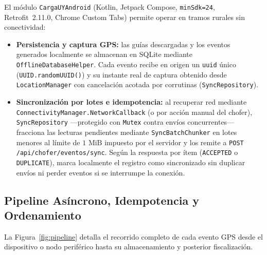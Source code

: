\documentclass[11pt,a4paper,twocolumn]{article}
\begin{document}
El módulo \texttt{CargaUYAndroid} (Kotlin, Jetpack Compose, \texttt{minSdk=24}, Retrofit~2.11.0, Chrome Custom Tabs) permite operar en tramos rurales sin conectividad:
\begin{itemize}
    \item \textbf{Persistencia y captura GPS:} las guías descargadas y los eventos generados localmente se almacenan en SQLite mediante \texttt{OfflineDatabaseHelper}. Cada evento recibe en origen un \texttt{uuid} único (\texttt{UUID.randomUUID()}) y su instante real de captura obtenido desde \texttt{LocationManager} con cancelación acotada por corrutinas (\texttt{SyncRepository}).
    \item \textbf{Sincronización por lotes e idempotencia:} al recuperar red mediante \texttt{ConnectivityManager.NetworkCallback} (o por acción manual del chofer), \texttt{SyncRepository} ---protegido con \texttt{Mutex} contra envíos concurrentes--- fracciona las lecturas pendientes mediante \texttt{SyncBatchChunker} en lotes menores al límite de $1\text{ MiB}$ impuesto por el servidor y los remite a \texttt{POST /api/chofer/eventos/sync}. Según la respuesta por ítem (\texttt{ACCEPTED} o \texttt{DUPLICATE}), marca localmente el registro como sincronizado sin duplicar envíos ni perder eventos si se interrumpe la conexión.
\end{itemize}

\subsection{Pipeline Asíncrono, Idempotencia y Ordenamiento}

La Figura~\ref{fig:pipeline} detalla el recorrido completo de cada evento GPS desde el dispositivo o nodo periférico hasta su almacenamiento y posterior fiscalización.
\end{document}
